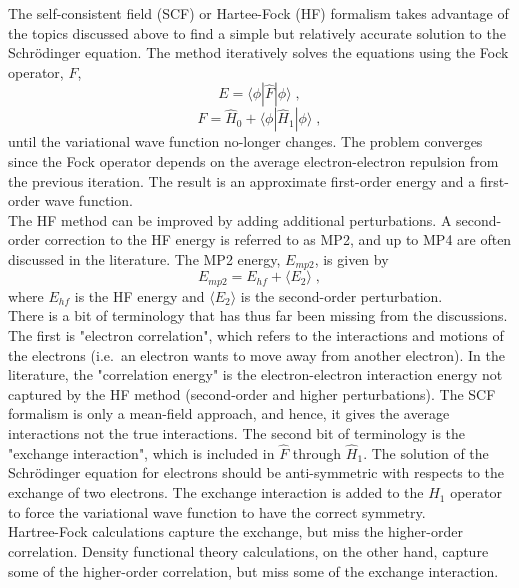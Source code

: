 \documentclass[12pt]{report}
\begin{document}
The self-consistent field (SCF) or Hartee-Fock (HF) formalism takes advantage
of the topics discussed above to find a simple but relatively accurate
solution to the Schr\"{o}dinger equation.
The method iteratively solves the equations using the Fock operator, $F$,
\begin{equation}
 E = \langle\phi|\hat F|\phi\rangle \; ,
\end{equation}
\begin{equation}
 \hat F = \hat H_0+\langle\phi|\hat H_1|\phi\rangle \; ,
\end{equation}
until the variational wave function no-longer changes.
The problem converges since the Fock operator depends on the average
electron-electron repulsion from the previous iteration.
The result is an approximate first-order energy and a first-order wave
function. \\

The HF method can be improved by adding additional perturbations.
A second-order correction to the HF energy is referred to as MP2, and up to
MP4 are often discussed in the literature.
The MP2 energy, $E_{mp2}$, is given by
\begin{equation}
 E_{mp2} = E_{hf} + \langle E_{2} \rangle \; ,
\end{equation}
where $E_{hf}$ is the HF energy and $\langle E_2 \rangle$ is the second-order
perturbation. \\

There is a bit of terminology that has thus far been missing from the
discussions.
The first is "electron correlation", which refers to the interactions and
motions of the electrons (i.e.\ an electron wants to move away from another
electron).
In the literature, the "correlation energy" is the electron-electron
interaction energy not captured by the HF method (second-order and higher
perturbations).
The SCF formalism is only a mean-field approach, and hence, it gives the
average interactions not the true interactions.
The second bit of terminology is the "exchange interaction", which is included
in $\hat F$ through $\hat H_1$.
The solution of the Schr\"{o}dinger equation for electrons should be
anti-symmetric with respects to the exchange of two electrons.
The exchange interaction is added to the $\hat H_1$ operator to force the
variational wave function to have the correct symmetry. \\

Hartree-Fock calculations capture the exchange, but miss the higher-order
correlation.
Density functional theory calculations, on the other hand, capture some of the
higher-order correlation, but miss some of the exchange interaction.
\end{document}
